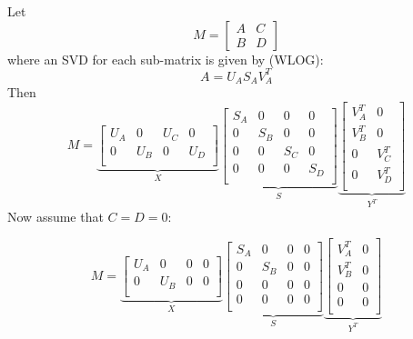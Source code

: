 \documentclass[11pt]{article}
\begin{document}
Let 
\[
M = \left[ \begin{array}{cc} A & C \\ B & D \end{array} \right]
\]
where an SVD for each sub-matrix is given by (WLOG):
\[ 
A = U_AS_AV_A^T
\]
Then
\[
M =
\underbrace{\left[ \begin{array}{cccc} 
U_A & 0 & U_C & 0\\
0 & U_B & 0 & U_D\\
\end{array} \right]}_{X} 
\underbrace{\left[ \begin{array}{cccc} 
S_A & 0 & 0 & 0\\
0 & S_B & 0 & 0\\
0 & 0 & S_C & 0\\
0 & 0 & 0 & S_D\\
\end{array} \right]}_{S} 
\underbrace{\left[ \begin{array}{cc} 
V_A^T & 0\\
V_B^T & 0\\
0 & V_C^T \\
0 & V_D^T \\
\end{array} \right]}_{Y^T} 
\]
Now assume that \(C = D = 0\):

\[
M =
\underbrace{\left[ \begin{array}{cccc} 
U_A & 0 & 0 & 0\\
0 & U_B & 0 & 0\\
\end{array} \right]}_{X} 
\underbrace{\left[ \begin{array}{cccc} 
S_A & 0 & 0 & 0\\
0 & S_B & 0 & 0\\
0 & 0 & 0 & 0\\
0 & 0 & 0 & 0\\
\end{array} \right]}_{S} 
\underbrace{\left[ \begin{array}{cc} 
V_A^T & 0\\
V_B^T & 0\\
0 & 0 \\
0 & 0 \\
\end{array} \right]}_{Y^T} 
\]
\end{document}
